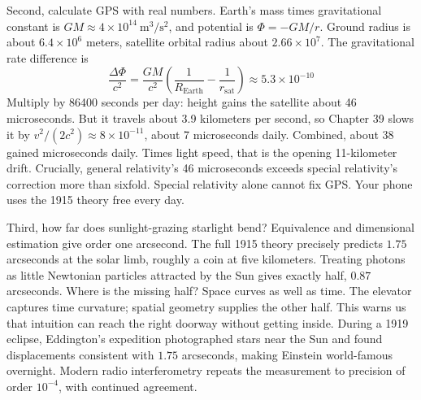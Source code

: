 \begin{mainline}
Second, calculate GPS with real numbers. Earth's mass times gravitational constant is \(GM\approx4\times10^{14}\ \mathrm{m^{3}/s^{2}}\), and potential is \(\Phi=-GM/r\). Ground radius is about \(6.4\times10^{6}\) meters, satellite orbital radius about \(2.66\times10^{7}\). The gravitational rate difference is
\[
\frac{\Delta\Phi}{c^{2}}=\frac{GM}{c^{2}}\left(\frac{1}{R_{\text{Earth}}}-\frac{1}{r_{\text{sat}}}\right)\approx5.3\times10^{-10}
\]
Multiply by 86400 seconds per day: height gains the satellite about 46 microseconds. But it travels about 3.9 kilometers per second, so Chapter 39 slows it by \(v^{2}/(2c^{2})\approx8\times10^{-11}\), about 7 microseconds daily. Combined, about 38 gained microseconds daily. Times light speed, that is the opening 11-kilometer drift. Crucially, general relativity's 46 microseconds exceeds special relativity's correction more than sixfold. Special relativity alone cannot fix GPS. Your phone uses the 1915 theory free every day.
\end{mainline}

\begin{mainline}
Third, how far does sunlight-grazing starlight bend? Equivalence and dimensional estimation give order one arcsecond. The full 1915 theory precisely predicts \(1.75\) arcseconds at the solar limb, roughly a coin at five kilometers. Treating photons as little Newtonian particles attracted by the Sun gives exactly half, \(0.87\) arcseconds. Where is the missing half? Space curves as well as time. The elevator captures time curvature; spatial geometry supplies the other half. This warns us that intuition can reach the right doorway without getting inside. During a 1919 eclipse, Eddington's expedition photographed stars near the Sun and found displacements consistent with \(1.75\) arcseconds, making Einstein world-famous overnight. Modern radio interferometry repeats the measurement to precision of order \(10^{-4}\), with continued agreement.
\end{mainline}

\begin{center}
\end{center}

